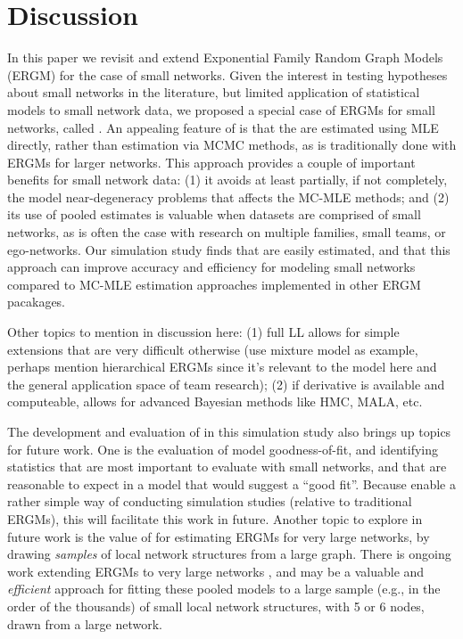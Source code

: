 \documentclass[12pt]{article}
\begin{document}
\pagebreak
\section{Discussion}

In this paper we revisit and extend Exponential Family Random Graph Models (ERGM) for the case of small networks. Given the interest in testing hypotheses about small networks in the literature, but limited application of statistical models to small network data, we proposed a special case of ERGMs for small networks, called \ergmitos{}. An appealing feature of \ergmitos{} is that the are estimated using MLE directly, rather than estimation via MCMC methods, as is traditionally done with ERGMs for larger networks. This approach provides a couple of important benefits for small network data: (1) it avoids at least partially, if not completely, the model near-degeneracy problems that affects the MC-MLE methods; and (2) its use of pooled estimates is valuable when datasets are comprised of small networks, as is often the case with research on multiple families, small teams, or ego-networks. Our simulation study finds that \ergmitos{} are easily estimated, and that this approach can improve accuracy and efficiency for modeling small networks compared to MC-MLE estimation approaches implemented in other ERGM pacakages.

Other topics to mention in discussion here: (1) full LL allows for simple extensions that are very difficult otherwise (use mixture model as example, perhaps mention hierarchical ERGMs since it's relevant to the model here and the general application space of team research); (2) if derivative is available and computeable, allows for advanced Bayesian methods like HMC, MALA, etc.

The development and evaluation of \ergmitos{} in this simulation study also brings up topics for future work. One is the evaluation of model goodness-of-fit, and identifying statistics that are most important to evaluate with small networks, and that are reasonable to expect in a model that would suggest a ``good fit''. Because \ergmitos{} enable a rather simple way of conducting simulation studies (relative to traditional ERGMs), this will facilitate this work in future. Another topic to explore in future work is the value of \ergmitos{} for estimating ERGMs for very large networks, by drawing \textit{samples} of local network structures from a large graph. There is ongoing work extending ERGMs to very large networks \cite{stivala2019exponential,STIVALA2016167}, and \ergmitos{} may be a valuable and \textit{efficient} approach for fitting these pooled models to a large sample (e.g., in the order of the thousands) of small local network structures, with 5 or 6 nodes, drawn from a large network. 
\end{document}
